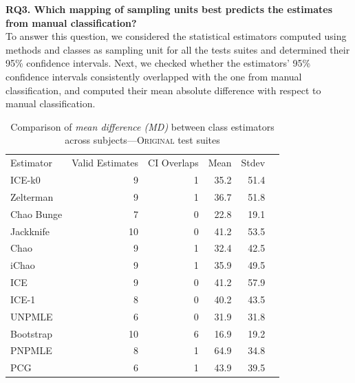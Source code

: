 \documentclass[sigconf,review,anonymous]{acmart}
\newcommand{\ICEallrare}{ICE-k0\xspace}
\newcommand{\Zelterman}{Zelterman\xspace}
\newcommand{\ChaoBunge}{Chao Bunge\xspace}
\newcommand{\Jackknife}{Jackknife\xspace}
\newcommand{\Chao}{Chao\xspace}
\newcommand{\improvedChao}{iChao\xspace}
\newcommand{\ICE}{ICE\xspace}
\newcommand{\improvedICE}{ICE-1\xspace}
\newcommand{\Unpmle}{UNPMLE\xspace}
\newcommand{\Bootstrap}{Bootstrap\xspace}
\newcommand{\Pnpmle}{PNPMLE\xspace}
\newcommand{\PCG}{PCG\xspace}
\newcommand{\Evosuite}{\textsc{EvoSuite}\xspace}
\newcommand{\original}{\textsc{Original}\xspace}
\begin{document}
\noindent\textbf{RQ3. Which mapping of sampling units best predicts the estimates
from manual classification?}\\ %
To answer this question, we considered the statistical estimators computed
using methods and classes as sampling unit for all the tests suites and
determined their 95\% confidence intervals.
%
Next, we checked whether the estimators' 95\% confidence intervals consistently
overlapped with the one from manual classification, and computed their mean absolute
difference with respect to manual classification.

\begin{table}[t]
\caption{Comparison of \emph{mean difference (MD)} between class
estimators across subjects---\original test suites}
\begin{tabular}{|l|r|r|r|r|r|}
Estimator	&Valid Estimates	&CI Overlaps	&Mean	&Stdev	\\
\ICEallrare	&	9	&	1	&35.2	&	51.4\\
\Zelterman	&	9	&	1	&36.7	&	51.8\\
\ChaoBunge	&	7	&	0	&22.8	&	19.1\\
\Jackknife	&	10	&	0	&41.2	&	53.5\\
\Chao	&	9	&	1	&32.4	&	42.5\\
\improvedChao	&	9	&	1	&35.9	&	49.5\\
\ICE	&	9	&	0	&41.2	&	57.9\\
\improvedICE	&	8	&	0	&40.2	&	43.5\\
\Unpmle	&	6	&	0	&31.9	&	31.8\\
\Bootstrap	&	10	&	6	&16.9	&	19.2\\
\Pnpmle	&	8	&	1	&64.9	&	34.8\\
\PCG	&	6	&	1	&43.9	&	39.5\\
\end{tabular}
\label{tbl:estoriginalclass}
\end{table}
\end{document}
